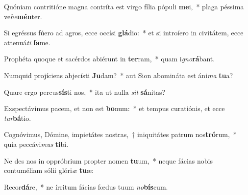 \item Quóniam contritióne magna contríta est virgo fília pópuli \textbf{me}i,~* plaga péssima ve\textit{he}\textbf{mén}ter.
\item Si egréssus fúero ad agros, ecce occísi \textbf{glá}dio:~* et si introíero in civitátem, ecce attenuá\textit{ti} \textbf{fa}me.
\item Prophéta quoque et sacérdos abiérunt in \textbf{ter}ram,~* quam i\textit{gno}\textbf{rá}bant.
\item Numquid projíciens abjecísti \textbf{Ju}dam?~* aut Sion abomináta est áni\textit{ma} \textbf{tu}a?
\item Quare ergo percus\textbf{sís}ti nos,~* ita ut nulla \textit{sit} \textbf{sá}nitas?
\item Exspectávimus pacem, et non est \textbf{bo}num:~* et tempus curatiónis, et ecce \textit{tur}\textbf{bá}tio.
\item Cognóvimus, Dómine, impietátes nostras,~† iniquitátes patrum nos\textbf{tró}rum,~* quia peccávi\textit{mus} \textbf{ti}bi.
\item Ne des nos in oppróbrium propter nomen \textbf{tu}um,~* neque fácias nobis contuméliam sólii glóri\textit{æ} \textbf{tu}æ:
\item Recor\textbf{dá}re,~* ne írritum fácias fœdus tuum \textit{no}\textbf{bís}cum.
